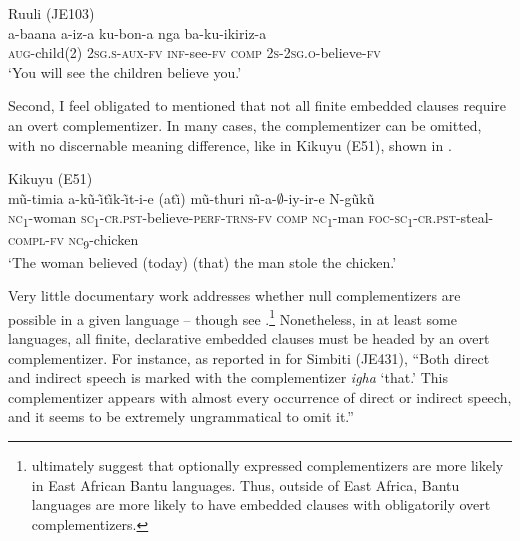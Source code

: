 \documentclass[output=paper,colorlinks,citecolor=brown,
]{langscibook}
\begin{document}
\ea \label{ex:Ruuli} Ruuli (JE103) \citep[94]{Sorensonetal:2020} \\
	\gll a-baana a-iz-a ku-bon-a nga ba-ku-ikiriz-a\\
	\textsc{aug}-child(2) 2\textsc{sg.s}-\textsc{aux-fv} \textsc{inf}-see-\textsc{fv} \textsc{comp} 2\textsc{s}-2\textsc{sg.o}-believe-\textsc{fv}\\
	\glt `You will see the children believe you.' 
\z

Second, I feel obligated to mentioned that not all finite embedded clauses require an overt complementizer. In many cases, the complementizer can be omitted, with no discernable meaning difference, like in Kikuyu (E51), shown in .

\ea \label{ex:gluckman:Kikuyu} Kikuyu (E51) \citep[150]{Englebretson:2015} \\
	\gll m\~u-timia a-k\~u-\~\i t\~\i k-\~\i t-i-e (at{\~\i}) m\~u-thuri n\~\i-a-$\emptyset$-iy-ir-e N-g\~uk\~u\\
	\textsc{nc}\textsubscript{1}-woman \textsc{sc}\textsubscript{1}-\textsc{cr.pst}-believe-\textsc{perf}-\textsc{trns}-\textsc{fv} \textsc{comp} \textsc{nc}\textsubscript{1}-man \textsc{foc}-\textsc{sc}\textsubscript{1}-\textsc{cr.pst}-steal-\textsc{compl}-\textsc{fv} \textsc{nc}\textsubscript{9}-chicken\\
	\glt `The woman believed (today) (that) the man stole the chicken.' 

\z

Very little documentary work addresses whether null complementizers are possible in a given language -- though see \citet[section 3.10]{Edelstenetal:2022}.\footnote{\citet{Edelstenetal:2022} ultimately suggest that optionally expressed complementizers are more likely in East African Bantu languages. Thus, outside of East Africa, Bantu languages are more likely to have embedded clauses with obligatorily overt complementizers.} Nonetheless, in at least some languages, all finite, declarative embedded clauses must be headed by an overt complementizer. For instance, as reported in \citet[8]{Masatu:2015} for Simbiti (JE431), ``Both direct and indirect speech is marked with the complementizer \textit{igha} `that.' This complementizer appears with almost every occurrence of direct or indirect speech, and it seems to be extremely ungrammatical to omit it.''
\end{document}
